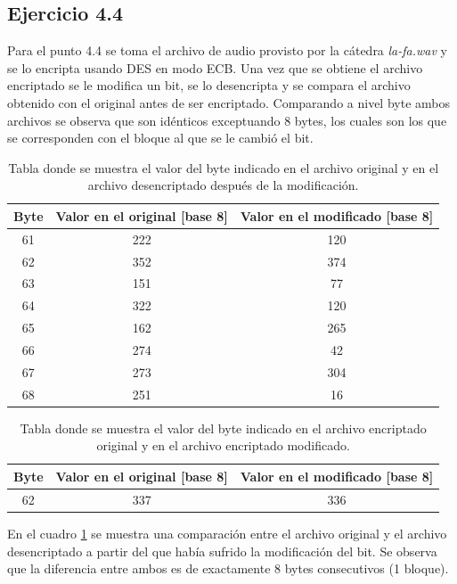 \documentclass[a4paper,10pt]{article}
\begin{document}
\subsection{Ejercicio 4.4}
Para el punto 4.4 se toma el archivo de audio provisto por la c\'atedra \emph{la-fa.wav} y se lo
encripta usando DES
en modo ECB. Una vez que se obtiene el archivo encriptado se le modifica un bit, se lo desencripta y 
se compara el archivo obtenido con el original antes de ser encriptado.
Comparando a nivel byte ambos archivos se observa que son id\'enticos exceptuando 8 bytes, los cuales
son los que se corresponden con el bloque al que se le cambi\'o el bit.
\begin{table}
\begin{center}
\begin{tabular}{|c|c|c|}
\hline
Byte & Valor en el original [base 8] & Valor en el modificado [base 8]\\
\hline
\hline
61 & 222 & 120\\
62 & 352 & 374\\
63 & 151 & 77\\
64 & 322 & 120\\
65 & 162 & 265\\
66 & 274 & 42\\
67 & 273 & 304\\
68 & 251 & 16\\
\hline
\end{tabular}
\end{center}
\caption{Tabla donde se muestra el valor del byte indicado en el archivo original y en el archivo desencriptado despu\'es de la modificaci\'on.}
\label{table44a}
\end{table}
\begin{table}
\begin{center}
\begin{tabular}{|c|c|c|}
\hline
Byte & Valor en el original [base 8] & Valor en el modificado [base 8] \\
\hline
\hline
62 & 337 & 336\\
\hline
\end{tabular} 
\end{center}
\caption{Tabla donde se muestra el valor del byte indicado en el archivo encriptado original y en el archivo encriptado modificado.}
\label{table44b}
\end{table}
En el cuadro \ref{table44a} se muestra una comparaci\'on entre el archivo original y el archivo desencriptado a partir del que hab\'ia sufrido 
la modificaci\'on del bit. Se observa que la diferencia entre ambos es de exactamente 8 bytes consecutivos (1 bloque).
\end{document}
